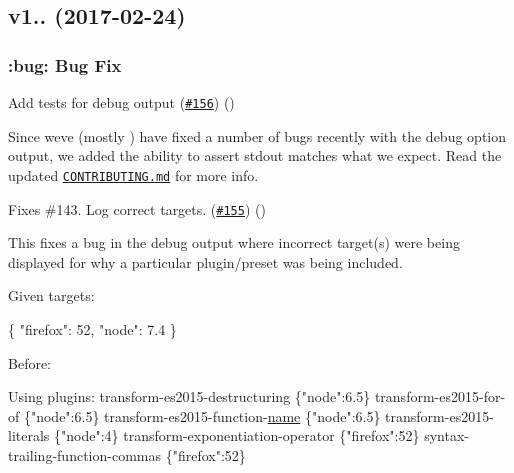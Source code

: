 \subsection*{v1.. (2017-\/02-\/24)}

\subsubsection*{\+:bug\+: Bug Fix}


\begin{DoxyItemize}
\item Add tests for debug output (\href{https://github.com/babel/babel-preset-env/pull/156}{\tt \#156}) ()
\end{DoxyItemize}

Since we\textquotesingle{}ve (mostly ) have fixed a number of bugs recently with the {\ttfamily debug} option output, we added the ability to assert stdout matches what we expect. Read the updated \href{https://github.com/babel/babel-preset-env/blob/master/CONTRIBUTING.md#testing-the-debug-option}{\tt C\+O\+N\+T\+R\+I\+B\+U\+T\+I\+N\+G.\+md} for more info.


\begin{DoxyItemize}
\item Fixes \#143. Log correct targets. (\href{https://github.com/babel/babel-preset-env/pull/155}{\tt \#155}) ()
\end{DoxyItemize}

This fixes a bug in the {\ttfamily debug} output where incorrect target(s) were being displayed for why a particular plugin/preset was being included.

Given targets\+:


\begin{DoxyCode}
\{
  \textcolor{stringliteral}{"firefox"}: 52,
  \textcolor{stringliteral}{"node"}: 7.4 
\}
\end{DoxyCode}


Before\+:


\begin{DoxyCode}
Using plugins:
  transform-es2015-destructuring \{\textcolor{stringliteral}{"node"}:6.5\}
  transform-es2015-\textcolor{keywordflow}{for}-of \{\textcolor{stringliteral}{"node"}:6.5\}
  transform-es2015-\textcolor{keyword}{function}-\mbox{\hyperlink{namespacesetup_ab3a7a0638d76a01367c5bc3cc699447f}{name}} \{\textcolor{stringliteral}{"node"}:6.5\}
  transform-es2015-literals \{\textcolor{stringliteral}{"node"}:4\}
  transform-exponentiation-\textcolor{keyword}{operator} \{\textcolor{stringliteral}{"firefox"}:52\}
  syntax-trailing-\textcolor{keyword}{function}-commas \{\textcolor{stringliteral}{"firefox"}:52\}
\end{DoxyCode}


